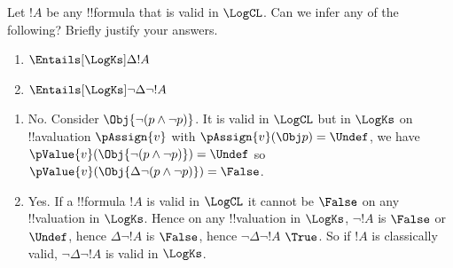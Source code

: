 \documentclass[../../../../include/open-logic-section]{subfiles}
\begin{document}
\begin{prob}
Let $!A$ be any !!{formula} that is valid in $\LogCL$. Can we infer any of the following?
Briefly justify your answers.
\begin{enumerate}
	\item $\Entails[\LogKs] \Delta !A$
	\item $\Entails[\LogKs] \lnot \Delta \lnot !A$
\end{enumerate}
\begin{ans}
\begin{enumerate}
	\item No. Consider $\Obj{\lnot (p \land \lnot p)}$. It is valid in $\LogCL$ but in $\LogKs$ on !!a{valuation} $\pAssign{v}$ with $\pAssign{v}(\Obj p)=\Undef$, we have $\pValue{v}(\Obj{\lnot (p \land \lnot p)})=\Undef$ so $\pValue{v}(\Obj{\Delta \lnot (p \land \lnot p)})=\False$.
	\item Yes. If a !!{formula} $!A$ is valid in $\LogCL$ it cannot be $\False$ on any !!{valuation} in $\LogKs$. Hence on any !!{valuation} in $\LogKs$, $\lnot !A$ is $\False$ or $\Undef$, hence $\Delta \lnot !A$ is $\False$, hence $\lnot \Delta \lnot !A$ $\True$. So 
	if $!A$ is classically valid, $\lnot \Delta \lnot !A$ is valid in $\LogKs$.
\end{enumerate}
\end{ans}
\end{prob}
\end{document}

